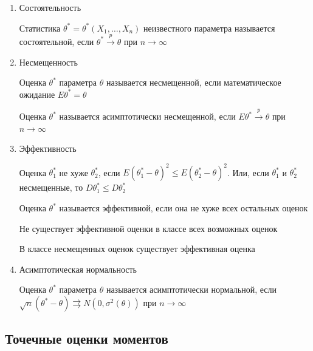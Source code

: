 \begin{enumerate}
    \item Состоятельность

    \Defs Статистика $\theta^* = \theta^*(X_1, \dots, X_n)$ неизвестного параметра называется
    состоятельной, если $\theta^* \overset{p}{\longrightarrow} \theta$ при $n \to \infty$

    \mediumvspace

    \item Несмещенность

    \Defs Оценка $\theta^*$ параметра $\theta$ называется несмещенной, если 
    математическое ожидание $E \theta^* = \theta$
    
    \Notas Оценка $\theta^*$ называется асимптотически несмещенной, если 
    $E \theta^* \overset{p}{\longrightarrow} \theta$ при $n \to \infty$

    \mediumvspace

    \item Эффективность 

    \Defs Оценка $\theta^*_1$ не хуже $\theta^*_2$, если $E (\theta^*_1 - \theta)^2 \leq E (\theta^*_2 - \theta)^2$.
    Или, если $\theta^*_1$ и $\theta^*_2$ несмещенные, то $D \theta^*_1 \leq D \theta^*_2$

    \Defs Оценка $\theta^*$ называется эффективной, если она не хуже всех остальных оценок

    \Notas Не существует эффективной оценки в классе всех возможных оценок

    \begin{MyTheorem}
        \Ths В классе несмещенных оценок существует эффективная оценка
    \end{MyTheorem}

    \mediumvspace

    \item Асимптотическая нормальность

    \Defs Оценка $\theta^*$ параметра $\theta$ называется асимптотически нормальной, если 
    $\sqrt{n} (\theta^* - \theta) \rightrightarrows N(0, \sigma^2 (\theta))$ при $n \to \infty$
    
\end{enumerate}

\subsection{Точечные оценки моментов}

\hypertarget{moments_point_estimation}{}

